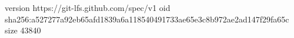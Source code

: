 version https://git-lfs.github.com/spec/v1
oid sha256:a527277a92eb65afd1839a6a118540491733ae65e3c8b972ae2ad147f29fa65c
size 43840
